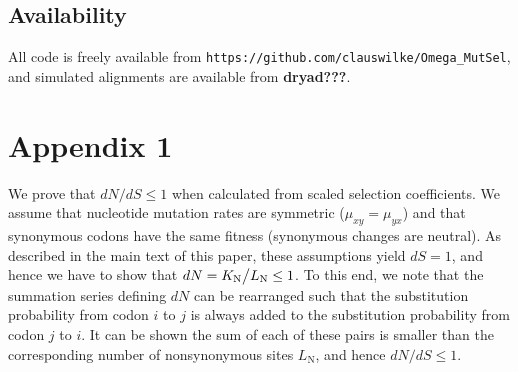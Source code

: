 \documentclass[11pt]{article}
\begin{document}
\subsection*{Availability}
All code is freely available from \texttt{https://github.com/clauswilke/Omega\_MutSel}, and simulated alignments are available from \textbf{dryad???}.



\section*{Appendix 1}
We prove that $dN/dS \leq 1$ when calculated from scaled selection coefficients. We assume that nucleotide mutation rates are symmetric ($\mu_{xy} = \mu_{yx}$) and that synonymous codons have the same fitness (synonymous changes are neutral). As described in the main text of this paper, these assumptions yield $dS = 1$, and hence we have to show that $dN = K_\text{N}\big{/}L_\text{N} \leq 1$. To this end, we note that the summation series defining $dN$ can be rearranged such that the substitution probability from codon $i$ to $j$ is always added to the substitution probability from codon $j$ to $i$. It can be shown the sum of each of these pairs is smaller than the corresponding number of nonsynonymous sites $L_\text{N}$, and hence $dN/dS \leq 1$.
\end{document}
